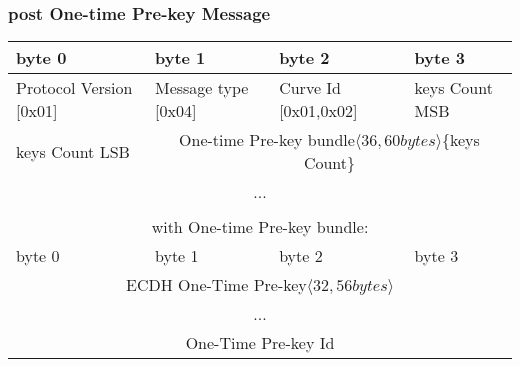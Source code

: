 \documentclass[a4paper,11pt]{article}
\begin{document}
    \subsubsection{post One-time Pre-key Message}
      \begin{center}
      \begin{tabular}{ | p{1.4in} | p{1.4in} | p{1.4in} | p{1.4in} |}
        \hline
        \cellcolor[gray]{0.85} byte 0 & \cellcolor[gray]{0.85} byte 1 & \cellcolor[gray]{0.85} byte 2 & \cellcolor[gray]{0.85}byte 3\\
        \hline
        Protocol Version [0x01] & Message type [0x04] & Curve Id [0x01,0x02] & keys Count MSB\\
        \hline
        keys Count LSB & \multicolumn{3}{|c|}{One-time Pre-key bundle$\langle 36,60bytes\rangle $\{keys Count\}}\\
        \cline{1-1}
        \multicolumn{4}{|c|}{...}\\
        \hline
        \multicolumn{4}{c}{}\\
        \multicolumn{4}{c}{with One-time Pre-key bundle:}\\
        \hline
        \cellcolor[gray]{0.95} byte 0 & \cellcolor[gray]{0.95} byte 1 & \cellcolor[gray]{0.95} byte 2 & \cellcolor[gray]{0.95}byte 3\\
        \hline
        \multicolumn{4}{|c|}{ECDH One-Time Pre-key$\langle 32,56bytes\rangle$}\\
        \multicolumn{4}{|c|}{...}\\
        \hline
        \multicolumn{4}{|c|}{One-Time Pre-key Id}\\
        \hline
      \end{tabular}
      \end{center}
     
\end{document}
